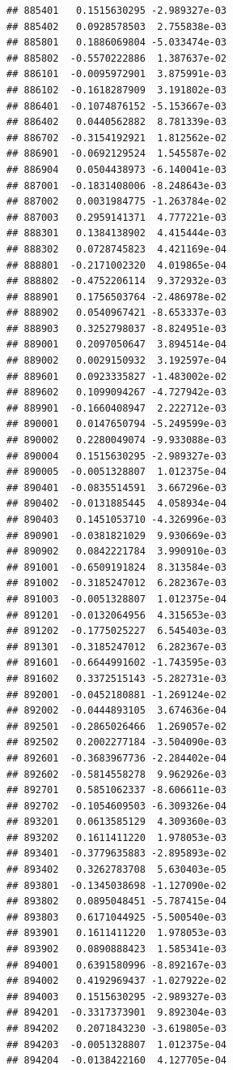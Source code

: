 \documentclass[ignorenonframetext,]{beamer}
\begin{document}
\begin{frame}[fragile]
\begin{verbatim}
## 885401   0.1515630295 -2.989327e-03
## 885402   0.0928578503  2.755838e-03
## 885801   0.1886069804 -5.033474e-03
## 885802  -0.5570222886  1.387637e-02
## 886101  -0.0095972901  3.875991e-03
## 886102  -0.1618287909  3.191802e-03
## 886401  -0.1074876152 -5.153667e-03
## 886402   0.0440562882  8.781339e-03
## 886702  -0.3154192921  1.812562e-02
## 886901  -0.0692129524  1.545587e-02
## 886904   0.0504438973 -6.140041e-03
## 887001  -0.1831408006 -8.248643e-03
## 887002   0.0031984775 -1.263784e-02
## 887003   0.2959141371  4.777221e-03
## 888301   0.1384138902  4.415444e-03
## 888302   0.0728745823  4.421169e-04
## 888801  -0.2171002320  4.019865e-04
## 888802  -0.4752206114  9.372932e-03
## 888901   0.1756503764 -2.486978e-02
## 888902   0.0540967421 -8.653337e-03
## 888903   0.3252798037 -8.824951e-03
## 889001   0.2097050647  3.894514e-04
## 889002   0.0029150932  3.192597e-04
## 889601   0.0923335827 -1.483002e-02
## 889602   0.1099094267 -4.727942e-03
## 889901  -0.1660408947  2.222712e-03
## 890001   0.0147650794 -5.249599e-03
## 890002   0.2280049074 -9.933088e-03
## 890004   0.1515630295 -2.989327e-03
## 890005  -0.0051328807  1.012375e-04
## 890401  -0.0835514591  3.667296e-03
## 890402  -0.0131885445  4.058934e-04
## 890403   0.1451053710 -4.326996e-03
## 890901  -0.0381821029  9.930669e-03
## 890902   0.0842221784  3.990910e-03
## 891001  -0.6509191824  8.313584e-03
## 891002  -0.3185247012  6.282367e-03
## 891003  -0.0051328807  1.012375e-04
## 891201  -0.0132064956  4.315653e-03
## 891202  -0.1775025227  6.545403e-03
## 891301  -0.3185247012  6.282367e-03
## 891601  -0.6644991602 -1.743595e-03
## 891602   0.3372515143 -5.282731e-03
## 892001  -0.0452180881 -1.269124e-02
## 892002  -0.0444893105  3.674636e-04
## 892501  -0.2865026466  1.269057e-02
## 892502   0.2002277184 -3.504090e-03
## 892601  -0.3683967736 -2.284402e-04
## 892602  -0.5814558278  9.962926e-03
## 892701   0.5851062337 -8.606611e-03
## 892702  -0.1054609503 -6.309326e-04
## 893201   0.0613585129  4.309360e-03
## 893202   0.1611411220  1.978053e-03
## 893401  -0.3779635883 -2.895893e-02
## 893402   0.3262783708  5.630403e-05
## 893801  -0.1345038698 -1.127090e-02
## 893802   0.0895048451 -5.787415e-04
## 893803   0.6171044925 -5.500540e-03
## 893901   0.1611411220  1.978053e-03
## 893902   0.0890888423  1.585341e-03
## 894001   0.6391580996 -8.892167e-03
## 894002   0.4192969437 -1.027922e-02
## 894003   0.1515630295 -2.989327e-03
## 894201  -0.3317373901  9.892304e-03
## 894202   0.2071843230 -3.619805e-03
## 894203  -0.0051328807  1.012375e-04
## 894204  -0.0138422160  4.127705e-04

\end{verbatim}
\end{frame}
\end{document}
